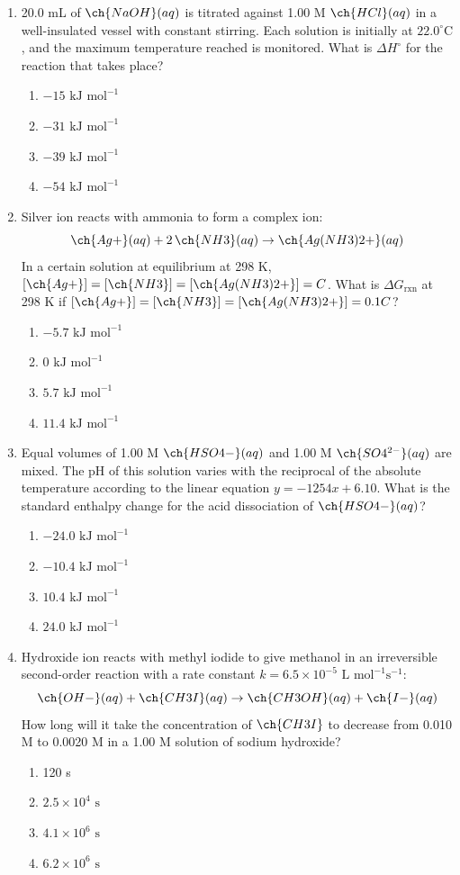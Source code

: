 \documentclass[twocolumn,10pt]{article}
\begin{document}
\begin{enumerate}[label=\arabic*., leftmargin=*]
\item 20.0 mL of $\ch{NaOH}(aq)$ is titrated against 1.00 M $\ch{HCl}(aq)$ in a well-insulated vessel with constant stirring. Each solution is initially at $22.0^\circ\text{C}$, and the maximum temperature reached is monitored. What is $\Delta H^\circ$ for the reaction that takes place?
\begin{enumerate}[label=(\Alph*)]
    \item $-15\text{ kJ mol}^{-1}$ \item $-31\text{ kJ mol}^{-1}$ \item $-39\text{ kJ mol}^{-1}$ \item $-54\text{ kJ mol}^{-1}$
\end{enumerate}

\item Silver ion reacts with ammonia to form a complex ion:
\[ \ch{Ag+}(aq) + 2\,\ch{NH3}(aq) \rightarrow \ch{Ag(NH3)2+}(aq) \]
In a certain solution at equilibrium at 298 K, $[\ch{Ag+}] = [\ch{NH3}] = [\ch{Ag(NH3)2+}] = C$. What is $\Delta G_{\text{rxn}}$ at 298 K if $[\ch{Ag+}] = [\ch{NH3}] = [\ch{Ag(NH3)2+}] = 0.1C$?
\begin{enumerate}[label=(\Alph*)]
    \item $-5.7\text{ kJ mol}^{-1}$ \item $0\text{ kJ mol}^{-1}$ \item $5.7\text{ kJ mol}^{-1}$ \item $11.4\text{ kJ mol}^{-1}$
\end{enumerate}

\item Equal volumes of 1.00 M $\ch{HSO4-}(aq)$ and 1.00 M $\ch{SO4^{2-}}(aq)$ are mixed. The pH of this solution varies with the reciprocal of the absolute temperature according to the linear equation $y = -1254x + 6.10$. What is the standard enthalpy change for the acid dissociation of $\ch{HSO4-}(aq)$?
\begin{enumerate}[label=(\Alph*)]
    \item $-24.0\text{ kJ mol}^{-1}$ \item $-10.4\text{ kJ mol}^{-1}$ \item $10.4\text{ kJ mol}^{-1}$ \item $24.0\text{ kJ mol}^{-1}$
\end{enumerate}

\item Hydroxide ion reacts with methyl iodide to give methanol in an irreversible second-order reaction with a rate constant $k = 6.5 \times 10^{-5}\text{ L mol}^{-1}\text{s}^{-1}$:
\[ \ch{OH-}(aq) + \ch{CH3I}(aq) \rightarrow \ch{CH3OH}(aq) + \ch{I-}(aq) \]
How long will it take the concentration of $\ch{CH3I}$ to decrease from 0.010 M to 0.0020 M in a 1.00 M solution of sodium hydroxide?
\begin{enumerate}[label=(\Alph*)]
    \item 120 s \item $2.5 \times 10^4\text{ s}$ \item $4.1 \times 10^6\text{ s}$ \item $6.2 \times 10^6\text{ s}$
\end{enumerate}


\end{enumerate}
\end{document}
